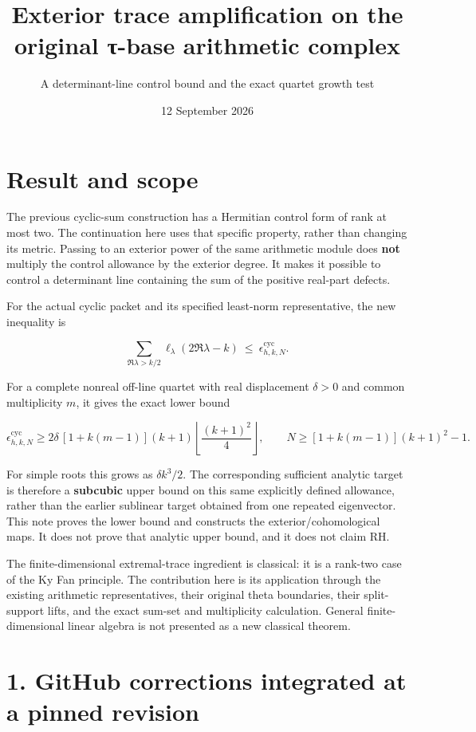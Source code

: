 \documentclass[
  11pt,
]{article}
\title{Exterior trace amplification on the original τ-base arithmetic
complex}
\subtitle{A determinant-line control bound and the exact quartet growth
test}
\author{}
\date{12 September 2026}
\begin{document}
\maketitle

{
\setcounter{tocdepth}{3}
\tableofcontents
}
\section{Result and scope}\label{result-and-scope}

The previous cyclic-sum construction has a Hermitian control form of
rank at most two. The continuation here uses that specific property,
rather than changing its metric. Passing to an exterior power of the
same arithmetic module does \textbf{not} multiply the control allowance
by the exterior degree. It makes it possible to control a determinant
line containing the sum of the positive real-part defects.

For the actual cyclic packet and its specified least-norm
representative, the new inequality is

\[
\boxed{
\sum_{\Re\lambda>k/2}\ell_\lambda(2\Re\lambda-k)
\ \leq\ \epsilon_{h,k,N}^{\mathrm{cyc}}.
}
\]

For a complete nonreal off-line quartet with real displacement
\(\delta>0\) and common multiplicity \(m\), it gives the exact lower
bound

\[
\boxed{
\epsilon_{h,k,N}^{\mathrm{cyc}}
\geq
2\delta\,[1+k(m-1)](k+1)
\left\lfloor\frac{(k+1)^2}{4}\right\rfloor,
\qquad
N\geq[1+k(m-1)](k+1)^2-1.
}
\]

For simple roots this grows as \(\delta k^3/2\). The corresponding
sufficient analytic target is therefore a \textbf{subcubic} upper bound
on this same explicitly defined allowance, rather than the earlier
sublinear target obtained from one repeated eigenvector. This note
proves the lower bound and constructs the exterior/cohomological maps.
It does not prove that analytic upper bound, and it does not claim RH.

The finite-dimensional extremal-trace ingredient is classical: it is a
rank-two case of the Ky Fan principle. The contribution here is its
application through the existing arithmetic representatives, their
original theta boundaries, their split-support lifts, and the exact
sum-set and multiplicity calculation. General finite-dimensional linear
algebra is not presented as a new classical theorem.

\section{1. GitHub corrections integrated at a pinned
revision}\label{github-corrections-integrated-at-a-pinned-revision}
\end{document}
